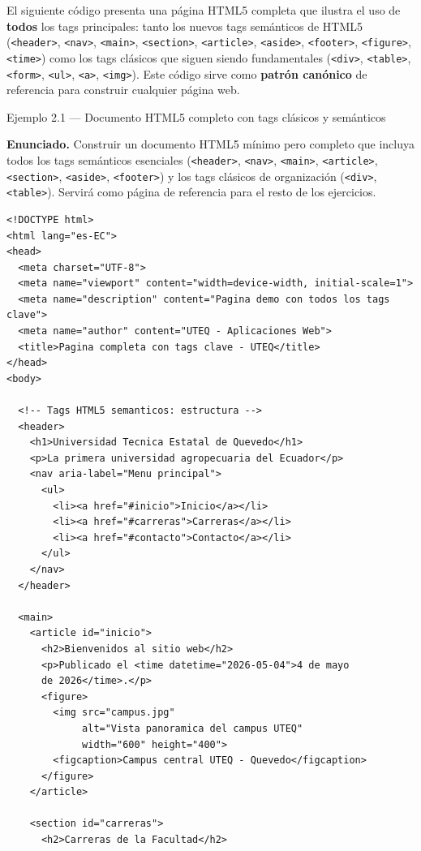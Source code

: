 \documentclass[11pt,a4paper,openany]{book}
\begin{document}
El siguiente código presenta una página HTML5 completa que ilustra
el uso de \textbf{todos} los tags principales: tanto los nuevos tags
semánticos de HTML5 (\texttt{<header>}, \texttt{<nav>},
\texttt{<main>}, \texttt{<section>}, \texttt{<article>},
\texttt{<aside>}, \texttt{<footer>}, \texttt{<figure>},
\texttt{<time>}) como los tags clásicos que siguen siendo
fundamentales (\texttt{<div>}, \texttt{<table>}, \texttt{<form>},
\texttt{<ul>}, \texttt{<a>}, \texttt{<img>}). Este código sirve como
\textbf{patrón canónico} de referencia para construir cualquier
página web.

\begin{cajaejemplo}{Ejemplo 2.1 --- Documento HTML5 completo con tags clásicos y semánticos}

\textbf{Enunciado.} Construir un documento HTML5 mínimo pero completo que incluya todos los tags semánticos esenciales (\texttt{<header>}, \texttt{<nav>}, \texttt{<main>}, \texttt{<article>}, \texttt{<section>}, \texttt{<aside>}, \texttt{<footer>}) y los tags clásicos de organización (\texttt{<div>}, \texttt{<table>}). Servirá como página de referencia para el resto de los ejercicios.

\begin{lstlisting}[style=html,caption={pagina-completa.html},label=lst:2.1]
<!DOCTYPE html>
<html lang="es-EC">
<head>
  <meta charset="UTF-8">
  <meta name="viewport" content="width=device-width, initial-scale=1">
  <meta name="description" content="Pagina demo con todos los tags clave">
  <meta name="author" content="UTEQ - Aplicaciones Web">
  <title>Pagina completa con tags clave - UTEQ</title>
</head>
<body>

  <!-- Tags HTML5 semanticos: estructura -->
  <header>
    <h1>Universidad Tecnica Estatal de Quevedo</h1>
    <p>La primera universidad agropecuaria del Ecuador</p>
    <nav aria-label="Menu principal">
      <ul>
        <li><a href="#inicio">Inicio</a></li>
        <li><a href="#carreras">Carreras</a></li>
        <li><a href="#contacto">Contacto</a></li>
      </ul>
    </nav>
  </header>

  <main>
    <article id="inicio">
      <h2>Bienvenidos al sitio web</h2>
      <p>Publicado el <time datetime="2026-05-04">4 de mayo
      de 2026</time>.</p>
      <figure>
        <img src="campus.jpg"
             alt="Vista panoramica del campus UTEQ"
             width="600" height="400">
        <figcaption>Campus central UTEQ - Quevedo</figcaption>
      </figure>
    </article>

    <section id="carreras">
      <h2>Carreras de la Facultad</h2>


\end{lstlisting}
\end{cajaejemplo}
\end{document}
